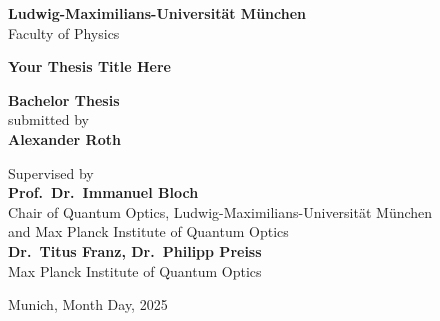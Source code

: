 \documentclass[12pt,twoside]{report}  %
\newcommand\blankpage{%
    \null
    \thispagestyle{empty}%
    \addtocounter{page}{-1}%
    \newpage}
\begin{document}
\begin{titlepage}
    \begin{center}
        \Large
        \textbf{Ludwig-Maximilians-Universität München}\\
        Faculty of Physics
        
        \vspace{1cm}
        
        {\Huge \textbf{Your Thesis Title Here}}

        \vspace{1cm}

\vspace{1cm}
        
        \Large
        \textbf{Bachelor Thesis}\\
        submitted by\\
        \textbf{Alexander Roth}
        
        \vspace{1cm}
        
        Supervised by\\
        \vspace{0.5cm}
        \textbf{Prof.\ Dr.\ Immanuel Bloch} \\
        Chair of Quantum Optics, Ludwig-Maximilians-Universität München \\
        and Max Planck Institute of Quantum Optics \\
        \vspace{0.5cm}
        \textbf{Dr.\ Titus Franz, Dr.\ Philipp Preiss} \\
        Max Planck Institute of Quantum Optics
        
        \vfill
        
        Munich, Month Day, 2025
    \end{center}
\end{titlepage}
\afterpage{\blankpage}

\tableofcontents
\listoffigures        %
\listoftables         %

\clearpage
{}
\end{document}
